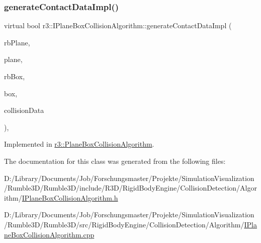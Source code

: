 \mbox{\label{classr3_1_1_i_plane_box_collision_algorithm_a48f6ca7613a0cc7c64d8e0cfe34674e8}} 
\subsubsection{\texorpdfstring{generate\+Contact\+Data\+Impl()}{generateContactDataImpl()}}
{\footnotesize\ttfamily virtual bool r3\+::\+I\+Plane\+Box\+Collision\+Algorithm\+::generate\+Contact\+Data\+Impl (\begin{DoxyParamCaption}\item[{\mbox{\hyperlink{classr3_1_1_rigid_body}{Rigid\+Body}} $\ast$}]{rb\+Plane,  }\item[{\mbox{\hyperlink{classr3_1_1_collision_plane}{Collision\+Plane}} $\ast$}]{plane,  }\item[{\mbox{\hyperlink{classr3_1_1_rigid_body}{Rigid\+Body}} $\ast$}]{rb\+Box,  }\item[{\mbox{\hyperlink{classr3_1_1_collision_box}{Collision\+Box}} $\ast$}]{box,  }\item[{\mbox{\hyperlink{classr3_1_1_collision_data}{Collision\+Data}} \&}]{collision\+Data }\end{DoxyParamCaption})\hspace{0.3cm}{\ttfamily [protected]}, {}}



Implemented in \mbox{\hyperlink{classr3_1_1_plane_box_collision_algorithm_a529c85973e9dab38e7427cdf9177d9ba}{r3\+::\+Plane\+Box\+Collision\+Algorithm}}.



The documentation for this class was generated from the following files\+:\begin{DoxyCompactItemize}
\item 
D\+:/\+Library/\+Documents/\+Job/\+Forschungsmaster/\+Projekte/\+Simulation\+Visualization/\+Rumble3\+D/\+Rumble3\+D/include/\+R3\+D/\+Rigid\+Body\+Engine/\+Collision\+Detection/\+Algorithm/\mbox{\hyperlink{_i_plane_box_collision_algorithm_8h}{I\+Plane\+Box\+Collision\+Algorithm.\+h}}\item 
D\+:/\+Library/\+Documents/\+Job/\+Forschungsmaster/\+Projekte/\+Simulation\+Visualization/\+Rumble3\+D/\+Rumble3\+D/src/\+Rigid\+Body\+Engine/\+Collision\+Detection/\+Algorithm/\mbox{\hyperlink{_i_plane_box_collision_algorithm_8cpp}{I\+Plane\+Box\+Collision\+Algorithm.\+cpp}}\end{DoxyCompactItemize}

